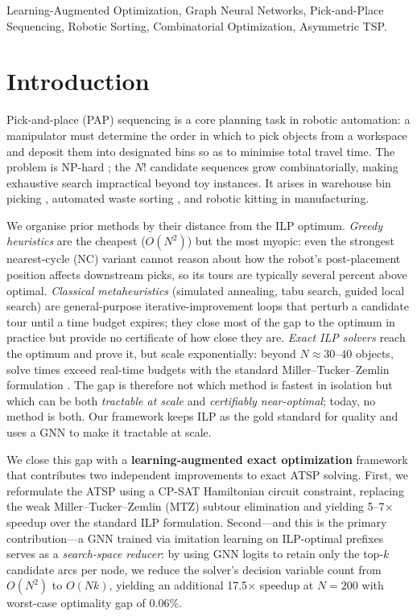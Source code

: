 \documentclass[conference]{IEEEtran}
\begin{document}
\begin{IEEEkeywords}
Learning-Augmented Optimization, Graph Neural Networks, Pick-and-Place Sequencing, Robotic Sorting, Combinatorial Optimization, Asymmetric TSP.
\end{IEEEkeywords}

\section{Introduction}

Pick-and-place (PAP) sequencing is a core planning task in robotic automation: a manipulator must determine the order in which to pick objects from a workspace and deposit them into designated bins so as to minimise total travel time. The problem is NP-hard \cite{chalasani1996}; the $N!$ candidate sequences grow combinatorially, making exhaustive search impractical beyond toy instances. It arises in warehouse bin picking \cite{cheng2024drl}, automated waste sorting \cite{gundupalli2021sequence, kiyokawa2024challenges}, and robotic kitting in manufacturing.

We organise prior methods by their distance from the ILP optimum. \emph{Greedy heuristics} are the cheapest ($O(N^2)$) but the most myopic: even the strongest nearest-cycle (NC) variant cannot reason about how the robot's post-placement position affects downstream picks, so its tours are typically several percent above optimal. \emph{Classical metaheuristics} (simulated annealing, tabu search, guided local search) are general-purpose iterative-improvement loops that perturb a candidate tour until a time budget expires; they close most of the gap to the optimum in practice but provide no certificate of how close they are. \emph{Exact ILP solvers} reach the optimum and prove it, but scale exponentially: beyond $N\!\approx\!30\text{--}40$ objects, solve times exceed real-time budgets with the standard Miller--Tucker--Zemlin formulation \cite{mtz1960}. The gap is therefore not which method is fastest in isolation but which can be both \emph{tractable at scale} and \emph{certifiably near-optimal}; today, no method is both. Our framework keeps ILP as the gold standard for quality and uses a GNN to make it tractable at scale.

We close this gap with a \textbf{learning-augmented exact optimization} framework that contributes two independent improvements to exact ATSP solving. First, we reformulate the ATSP using a CP-SAT Hamiltonian circuit constraint, replacing the weak Miller--Tucker--Zemlin (MTZ) subtour elimination \cite{mtz1960} and yielding 5--7$\times$ speedup over the standard ILP formulation. Second---and this is the primary contribution---a GNN trained via imitation learning on ILP-optimal prefixes serves as a \emph{search-space reducer}: by using GNN logits to retain only the top-$k$ candidate arcs per node, we reduce the solver's decision variable count from $O(N^2)$ to $O(Nk)$, yielding an additional 17.5$\times$ speedup at $N{=}200$ with worst-case optimality gap of 0.06\%.
\end{document}
